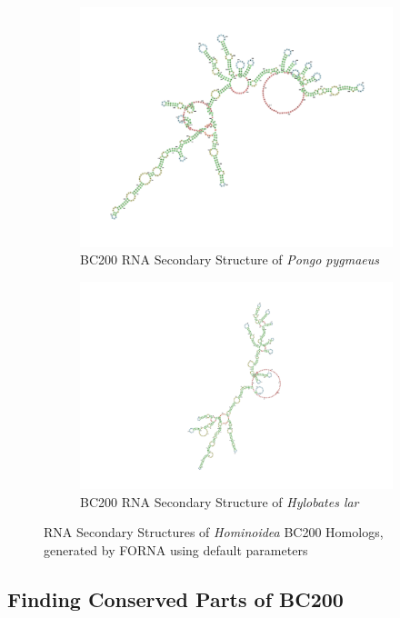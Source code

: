 \documentclass[conference, 11pt]{IEEEtran}
\begin{document}
{\begin{figure}[!h]
\begin{subfigure}[b]{0.4\textwidth}
    \includegraphics[width=\textwidth]{figs/rnapongo.png}
    \caption{BC200 RNA Secondary Structure of \emph{Pongo pygmaeus}}
    \label{fig:pongo-structure}
  \end{subfigure}
  \hfill
  \begin{subfigure}[b]{0.5\textwidth}   
    \centering
    \includegraphics[width=\textwidth]{figs/rnahylobates.png}
    \caption{BC200 RNA Secondary Structure of \emph{Hylobates lar}}
    \label{fig:hylobates-structure}
  \end{subfigure}
  \caption{RNA Secondary Structures of \emph{Hominoidea} BC200 Homologs, generated by FORNA \cite{kerpedjiev2015forna} using default parameters}
  \label{fig:rna-sec-structure}
\end{figure}

\subsection{Finding Conserved Parts of BC200}

}
\end{document}
